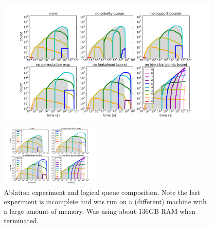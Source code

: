 \begin{figure}[t!]
\begin{center}
\begin{arxiv}
\includegraphics[width=\textwidth]{figs/ela_compas_compare-queue.pdf}
\end{arxiv}
\begin{kdd}
\includegraphics[trim={30mm 10mm 20mm 10mm}, width=0.45\textwidth]{figs/ela_compas_compare_small-queue.pdf}
\end{kdd}
\end{center}
\caption{Ablation experiment and logical queue composition.
Note the last experiment is incomplete and was run on a (different)
machine with a large amount of memory.  Was using about 136GB RAM when terminated.
}
\label{fig:queue}
\end{figure}


